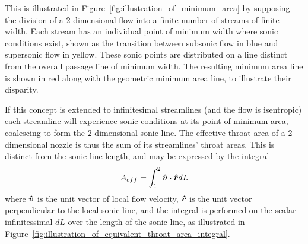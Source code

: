 \documentclass[a4paper, 11pt, twoside]{report}
\begin{document}
This is illustrated in Figure~\ref{fig:illustration_of_minimum_area} by supposing the division of a 2-dimensional flow into a finite number of streams of finite width. Each stream has an individual point of minimum width where sonic conditions exist, shown as the transition between subsonic flow in blue and supersonic flow in yellow. These sonic points are distributed on a line distinct from the overall passage line of minimum width. The resulting minimum area line is shown in red along with the geometric minimum area line, to illustrate their disparity.

If this concept is extended to infinitesimal streamlines (and the flow is isentropic) each streamline will experience sonic conditions at its point of minimum area, coalescing to form the 2-dimensional sonic line. The effective throat area of a 2-dimensional nozzle is thus the sum of its streamlines' throat areas. This is distinct from the sonic line length, and may be expressed by the integral
\begin{equation}\label{effective_throat_area_integral}
	A_{eff} = 
	\int_{1}^2 \vu*{v} \vdot \vu*{r} dL
\end{equation}
where $\vu*{v}$ is the unit vector of local flow velocity, $\vu*{r}$ is the unit vector perpendicular to the local sonic line, and the integral is performed on the scalar infinitessimal $dL$ over the length of the sonic line, as illustrated in Figure~\ref{fig:illustration_of_equivalent_throat_area_integral}.
 		
\end{document}
